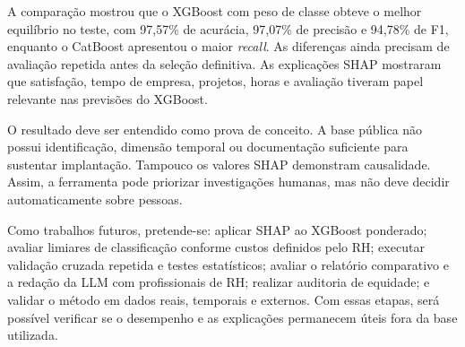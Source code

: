\documentclass[12pt]{article}
\begin{document}
A comparação mostrou que o XGBoost com peso de classe obteve o melhor equilíbrio no teste, com 97,57\% de acurácia, 97,07\% de precisão e 94,78\% de F1, enquanto o CatBoost apresentou o maior \textit{recall}. As diferenças ainda precisam de avaliação repetida antes da seleção definitiva. As explicações SHAP mostraram que satisfação, tempo de empresa, projetos, horas e avaliação tiveram papel relevante nas previsões do XGBoost.

O resultado deve ser entendido como prova de conceito. A base pública não possui identificação, dimensão temporal ou documentação suficiente para sustentar implantação. Tampouco os valores SHAP demonstram causalidade. Assim, a ferramenta pode priorizar investigações humanas, mas não deve decidir automaticamente sobre pessoas.

Como trabalhos futuros, pretende-se: aplicar SHAP ao XGBoost ponderado; avaliar limiares de classificação conforme custos definidos pelo RH; executar validação cruzada repetida e testes estatísticos; avaliar o relatório comparativo e a redação da LLM com profissionais de RH; realizar auditoria de equidade; e validar o método em dados reais, temporais e externos. Com essas etapas, será possível verificar se o desempenho e as explicações permanecem úteis fora da base utilizada.



\end{document}
